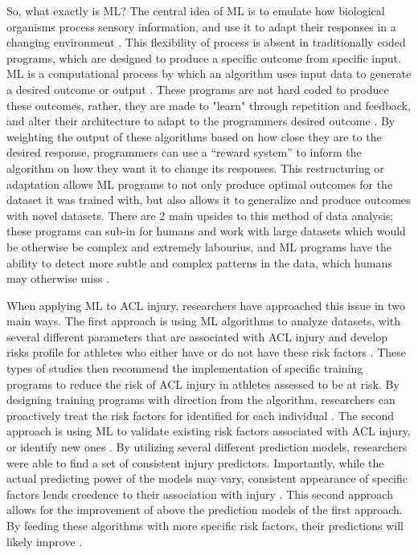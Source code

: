 \documentclass[stu,12pt,floatsintext]{apa7}
\begin{document}
So, what exactly is ML? The central idea of ML is to emulate how biological organisms process sensory information, and use it to adapt their responses in a changing environment \parencite{MLhistory, WhatisML}. This flexibility of process is absent in traditionally coded programs, which are designed to produce a specific outcome from specific input.   ML is a computational process by which an algorithm uses input data to generate a desired outcome or output \parencite{WhatisML}. These programs are not hard coded to produce these outcomes, rather, they are made to "learn" through repetition and feedback, and alter their architecture to adapt to the programmers desired outcome \parencite{WhatisML}. By weighting the output of these algorithms based on how close they are to the desired response, programmers can use a “reward system” to inform the algorithm on how they want it to change its responses. This restructuring or adaptation allows ML programs to not only produce optimal outcomes for the dataset it was trained with, but also allows it to generalize and produce outcomes with novel datasets.  There are 2 main upsides to this method of data analysis; these programs can sub-in for humans and work with large datasets which would be otherwise be complex and extremely labourius, and ML programs have the ability to detect more subtle and complex patterns in the data, which humans may otherwise miss \parencite{WhatisML}. 

When applying ML to ACL injury, researchers have approached this issue in two main ways. The first approach is using ML algorithms to analyze datasets, with several different parameters that are associated with ACL injury and develop risks profile for athletes who either have or do not have these risk factors \parencite{Jauhiainen_2022,Taborri_2021}. These types of studies then recommend the implementation of specific training programs to reduce the risk of ACL injury in athletes assessed to be at risk. By designing training programs with direction from the algorithm, researchers can proactively treat the risk factors for identified for each individual \parencite{Taborri_2021}. The second approach is using ML to validate existing risk factors associated with ACL injury, or identify new ones \parencite{Jauhiainen_2020, Kokkotis_2022}. By utilizing several different prediction models, researchers were able to find a set of consistent injury predictors. Importantly, while the actual predicting power of the models may vary, consistent appearance of specific factors lends creedence to their association with injury \parencite{Jauhiainen_2020,Kokkotis_2022}. This second approach allows for the improvement of above the prediction models of the first approach. By feeding these algorithms with more specific risk factors, their predictions will likely improve \parencite{Jauhiainen_2020}.
\end{document}

